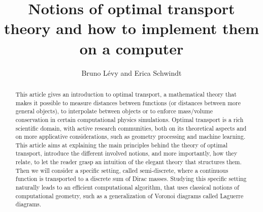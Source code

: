 \documentclass{article}
\begin{document}


\title{Notions of optimal transport theory and how to implement them on a computer}

\author{Bruno L\'{e}vy and Erica Schwindt}



\maketitle

\begin{abstract}
  This article gives an introduction to optimal transport, a mathematical
theory that makes it possible to measure distances between
functions (or distances between more general objects), to
interpolate between objects or to enforce mass/volume conservation
in certain computational physics simulations. Optimal transport
is a rich scientific domain, with active research communities, both on its theoretical
aspects and on more applicative considerations, such as geometry
processing and machine learning. This article aims at explaining
the main principles behind the theory of optimal transport, introduce
the different involved notions, and more importantly, how they
relate, to let the reader grasp an intuition of the elegant
theory that structures them. Then we will consider a specific setting,
called semi-discrete, where a continuous function is transported to a discrete
sum of Dirac masses. Studying this specific setting naturally leads to an
efficient computational algorithm, that uses classical notions of computational
geometry, such as a generalization of Voronoi diagrams called Laguerre diagrams.
\end{abstract}










\end{document}
